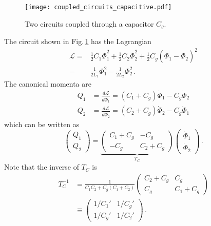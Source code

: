

\begin{figure}
\begin{centering}
\texttt{[image: coupled\_circuits\_capacitive.pdf]}
\par\end{centering}
\caption{Two circuits coupled through a capacitor $C_g$.}
\label{Fig:coupledCircuits_capacitive}
\end{figure}

The circuit shown in Fig.\,\ref{Fig:coupledCircuits_capacitive} has the Lagrangian
\begin{align}
  \mathcal{L}
  =& \frac{1}{2}C_1\dot{\Phi}_1^2 + \frac{1}{2}C_2\dot{\Phi}_2^2
   + \frac{1}{2}C_g \left( \dot{\Phi}_1 - \dot{\Phi_2} \right)^2 \nonumber \\
  -& \frac{1}{2L_1}\Phi_1^2 - \frac{1}{2L_2}\Phi_2^2 \, .
\end{align}
The canonical momenta are
\begin{align}
  Q_1 &= \frac{d \mathcal{L}}{d\dot{\Phi}_1} = (C_1 + C_g) \dot{\Phi}_1 - C_g\dot{\Phi}_2 \nonumber \\
  Q_2 &= \frac{d \mathcal{L}}{d\dot{\Phi}_2} = (C_2 + C_g) \dot{\Phi}_2 - C_g\dot{\Phi}_1
\end{align}
which can be written as
\begin{equation}
  \left( \begin{array}{c} Q_1 \\ Q_2 \end{array} \right) =
  \underbrace{
    \left( \begin{array}{cc} C_1 + C_g & -C_g \\ -C_g & C_2 + C_g \end{array} \right)}_{T_C}
  \left( \begin{array}{c} \dot{\Phi}_1 \\ \dot{\Phi}_2 \end{array} \right)
  \, .
\end{equation}
Note that the inverse of $T_C$ is
\begin{align}
  T_C^{-1}
  &= \frac{1}{C_1 C_2 + C_g (C_1 + C_2)}
    \left( \begin{array}{cc} C_2 + C_g & C_g \\ C_g & C_1 + C_g \end{array} \right) \nonumber \\
  &\equiv \left(
    \begin{array}{cc} 1/C_1' & 1/C_g' \\ 1/C_g' & 1/C_2' \end{array}
    \right) \, .
\end{align}
